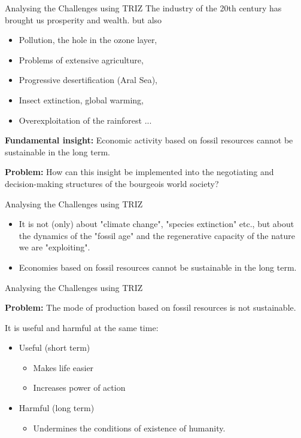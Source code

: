 \documentclass{beamer}
\begin{document}
\begin{frame}{Analysing the Challenges using TRIZ}
  The industry of the 20th century has brought us prosperity and wealth.  but
  also
\begin{itemize}
\item Pollution, the hole in the ozone layer,
\item Problems of extensive agriculture,
\item Progressive desertification (Aral Sea),
\item Insect extinction, global warming,
\item Overexploitation of the rainforest ...
\end{itemize}

\textbf{Fundamental insight:} Economic activity based on fossil resources
cannot be sustainable in the long term.

\textbf{Problem:} How can this insight be implemented into the negotiating and
decision-making structures of the bourgeois world society?
\end{frame}

\begin{frame}{Analysing the Challenges using TRIZ}
  \begin{itemize}
  \item It is not (only) about "climate change", "species extinction" etc.,
    but about the dynamics of the "fossil age" and the regenerative capacity
    of the nature we are "exploiting".
  \item Economies based on fossil resources cannot be sustainable in the
    long term.  
  \end{itemize}
\end{frame}

\begin{frame}{Analysing the Challenges using TRIZ}
  
\textbf{Problem:} The mode of production based on fossil resources is not
sustainable.

It is useful and harmful at the same time:
\begin{itemize}
\item Useful (short term)
  \begin{itemize}
  \item Makes life easier
  \item Increases power of action
  \end{itemize}
\item Harmful (long term)
  \begin{itemize}
  \item Undermines the conditions of existence of humanity.
  \end{itemize}
\end{itemize}
\end{frame}
\end{document}
